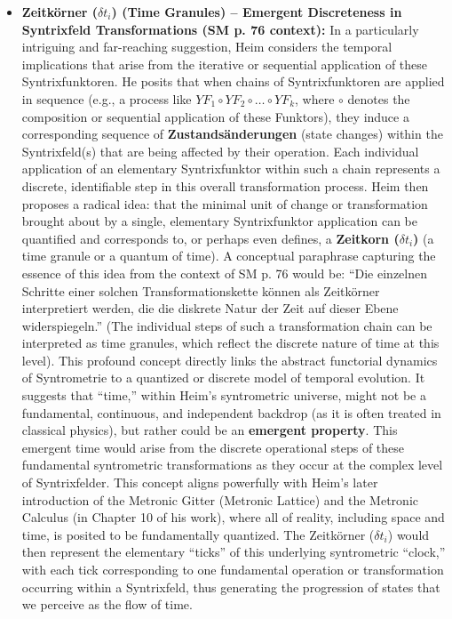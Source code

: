 \documentclass[12pt]{article}
\newcommand{\q}[1]{\enquote{#1}}
\newcommand{\syntrixfunktor}{YF}
\newcommand{\zeitkorn}{\delta t_i}
\begin{document}
\begin{itemize}
    \item \textbf{Zeitkörner (\(\zeitkorn\)) (Time Granules) – Emergent Discreteness in Syntrixfeld Transformations (SM p. 76 context):}
    In a particularly intriguing and far-reaching suggestion, Heim considers the temporal implications that arise from the iterative or sequential application of these Syntrixfunktoren. He posits that when chains of Syntrixfunktoren are applied in sequence (e.g., a process like \( \syntrixfunktor_1 \circ \syntrixfunktor_2 \circ \dots \circ \syntrixfunktor_k \), where \( \circ \) denotes the composition or sequential application of these Funktors), they induce a corresponding sequence of \textbf{Zustandsänderungen} (state changes) within the Syntrixfeld(s) that are being affected by their operation. Each individual application of an elementary Syntrixfunktor within such a chain represents a discrete, identifiable step in this overall transformation process.
    Heim then proposes a radical idea: that the minimal unit of change or transformation brought about by a single, elementary Syntrixfunktor application can be quantified and corresponds to, or perhaps even defines, a \textbf{Zeitkorn (\( \zeitkorn \))} (a time granule or a quantum of time). A conceptual paraphrase capturing the essence of this idea from the context of SM p. 76 would be: \q{Die einzelnen Schritte einer solchen Transformationskette können als Zeitkörner interpretiert werden, die die diskrete Natur der Zeit auf dieser Ebene widerspiegeln.} (The individual steps of such a transformation chain can be interpreted as time granules, which reflect the discrete nature of time at this level).
    This profound concept directly links the abstract functorial dynamics of Syntrometrie to a quantized or discrete model of temporal evolution. It suggests that \q{time,} within Heim's syntrometric universe, might not be a fundamental, continuous, and independent backdrop (as it is often treated in classical physics), but rather could be an \textbf{emergent property}. This emergent time would arise from the discrete operational steps of these fundamental syntrometric transformations as they occur at the complex level of Syntrixfelder. This concept aligns powerfully with Heim's later introduction of the Metronic Gitter (Metronic Lattice) and the Metronic Calculus (in Chapter 10 of his work), where all of reality, including space and time, is posited to be fundamentally quantized. The Zeitkörner (\(\zeitkorn\)) would then represent the elementary \q{ticks} of this underlying syntrometric \q{clock,} with each tick corresponding to one fundamental operation or transformation occurring within a Syntrixfeld, thus generating the progression of states that we perceive as the flow of time.


\end{itemize}
\end{document}

